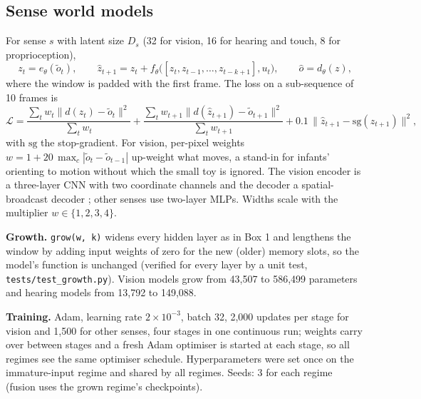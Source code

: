 \documentclass[
]{article}
\begin{document}
\hypertarget{sense-world-models}{%
\subsection{Sense world models}\label{sense-world-models}}

For sense \(s\) with latent size \(D_s\) (32 for vision, 16 for hearing
and touch, 8 for proprioception),
\[z_t=e_\theta(\tilde o_t),\qquad \hat z_{t+1}=z_t+f_\theta\big([z_t,z_{t-1},\dots,z_{t-k+1}],u_t\big),\qquad \hat o=d_\theta(z),\]
where the window is padded with the first frame. The loss on a
sub-sequence of 10 frames is
\[\mathcal L=\frac{\sum_t w_t\lVert d(z_t)-\tilde o_t\rVert^2}{\sum_t w_t}+\frac{\sum_t w_{t+1}\lVert d(\hat z_{t+1})-\tilde o_{t+1}\rVert^2}{\sum_t w_{t+1}}+0.1\,\lVert\hat z_{t+1}-\mathrm{sg}(z_{t+1})\rVert^2,\]
with \(\mathrm{sg}\) the stop-gradient. For vision, per-pixel weights
\(w=1+20\,\max_c|\tilde o_t-\tilde o_{t-1}|\) up-weight what moves, a
stand-in for infants' orienting to motion without which the small toy is
ignored. The vision encoder is a three-layer CNN with two coordinate
channels and the decoder a spatial-broadcast decoder
\citep{watters2019spatial}; other senses use two-layer MLPs. Widths
scale with the multiplier \(w\in\{1,2,3,4\}\).

\textbf{Growth.}
\texttt{grow(w\textquotesingle{},\ k\textquotesingle{})} widens every
hidden layer as in Box 1 and lengthens the window by adding input
weights of zero for the new (older) memory slots, so the model's
function is unchanged (verified for every layer by a unit test,
\texttt{tests/test\_growth.py}). Vision models grow from 43,507 to
586,499 parameters and hearing models from 13,792 to 149,088.

\textbf{Training.} Adam, learning rate \(2\times10^{-3}\), batch 32,
2,000 updates per stage for vision and 1,500 for other senses, four
stages in one continuous run; weights carry over between stages and a
fresh Adam optimiser is started at each stage, so all regimes see the
same optimiser schedule. Hyperparameters were set once on the
immature-input regime and shared by all regimes. Seeds: 3 for each
regime (fusion uses the grown regime's checkpoints).
\end{document}
